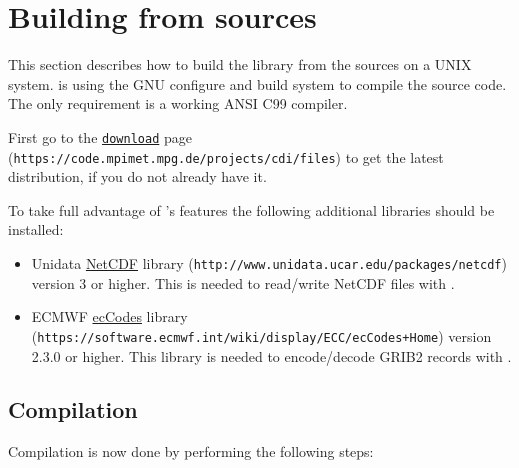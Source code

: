 \section{\label{build}Building from sources}

This section describes how to build the {\CDI} library from the sources on a UNIX system.
{\CDI} is using the GNU configure and build system to compile the source code.
The only requirement is a working ANSI C99 compiler.

First go to the \href{https://code.mpimet.mpg.de/projects/cdi/files}{\texttt{download}} page
(\texttt{https://code.mpimet.mpg.de/projects/cdi/files}) to get the latest distribution,
if you do not already have it.

To take full advantage of {\CDI}'s features the following additional libraries should be installed:

\begin{itemize}
\item Unidata \href{http://www.unidata.ucar.edu/packages/netcdf}{NetCDF} library
      (\texttt{http://www.unidata.ucar.edu/packages/netcdf})
      version 3 or higher.
      This is needed to read/write NetCDF files with {\CDI}. 
\item ECMWF \href{https://software.ecmwf.int/wiki/display/ECC/ecCodes+Home}{ecCodes} library
      (\texttt{https://software.ecmwf.int/wiki/display/ECC/ecCodes+Home})
      version 2.3.0 or higher.
      This library is needed to encode/decode GRIB2 records with {\CDI}. 
\end{itemize}


\subsection{Compilation}

Compilation is now done by performing the following steps:

